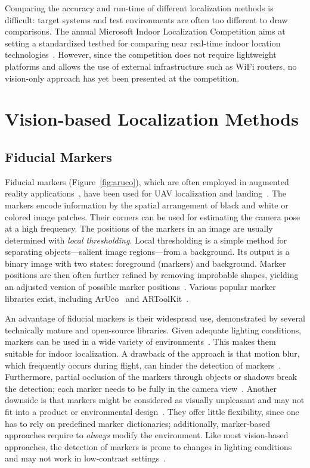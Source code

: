 \documentclass{report}
\begin{document}
Comparing the accuracy and run-time of different localization methods
is difficult: target systems and test environments are often too
different to draw comparisons. The annual Microsoft Indoor
Localization Competition aims at setting a standardized testbed for
comparing near real-time indoor location
technologies~\cite{microsoft}. However, since the competition does not
require lightweight platforms and allows the use of external
infrastructure such as WiFi routers, no vision-only approach has yet
been presented at the competition.

\section{Vision-based Localization Methods}

\subsection{Fiducial Markers}
\label{sec:fiducialmarkers}

Fiducial markers (Figure~\ref{fig:aruco}), which are often employed in
augmented reality
applications~\cite{kato1999marker,garrido2014automatic}, have been
used for UAV localization and
landing~\cite{eberli2011vision,bebop2015}. The markers encode
information by the spatial arrangement of black and white or colored
image patches. Their corners can be used for estimating the camera
pose at a high frequency. The positions of the markers in an image are
usually determined with \emph{local thresholding}. Local thresholding
is a simple method for separating objects---salient image
regions---from a background. Its output is a binary image with two
states: foreground (markers) and background. Marker positions are then
often further refined by removing improbable shapes, yielding an
adjusted version of possible marker
positions~\cite{aruco2014}. Various popular marker libraries exist,
including ArUco~\cite{aruco2014} and ARToolKit~\cite{kato1999marker}.

An advantage of fiducial markers is their widespread use, demonstrated
by several technically mature and open-source libraries. Given
adequate lighting conditions, markers can be used in a wide variety of
environments~\cite{hornecker2005using}. This makes them suitable for
indoor localization.  A drawback of the approach is that motion blur,
which frequently occurs during flight, can hinder the detection of
markers~\cite{albasiouny2015mean}. Furthermore, partial occlusion of
the markers through objects or shadows break the detection; each
marker needs to be fully in the camera
view~\cite{hornecker2005using}. Another downside is that markers might
be considered as visually unpleasant and may not fit into a product or
environmental design~\cite{chu2013halftone}. They offer little
flexibility, since one has to rely on predefined marker dictionaries;
additionally, marker-based approaches require to \emph{always} modify
the environment. Like most vision-based approaches, the detection of
markers is prone to changes in lighting conditions and may not work in
low-contrast settings~\cite{hornecker2005using}.
\end{document}

